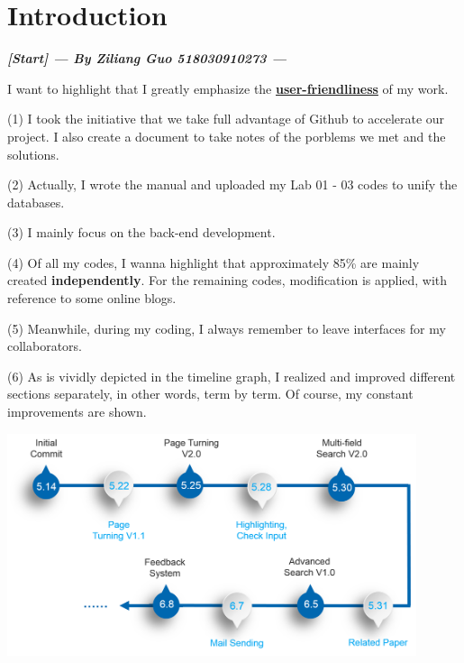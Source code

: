 \documentclass[10pt,twoside,a4paper,titlepage]{article}
\begin{document}
	\section{Introduction}
		\textbf{\emph{[Start] --- By Ziliang Guo 518030910273 ---}}\newline\par
		I want to highlight that I greatly emphasize the \textbf{\underline{user-friendliness}} of my work.\par
		(1) I took the initiative that we take full advantage of Github to accelerate our project. I also create a document to take notes of the porblems we met and the solutions.\newline\par
		(2) Actually, I wrote the manual and uploaded my Lab 01 - 03 codes to unify the databases.\newline\par
		(3)	I mainly focus on the back-end development.\newline\par
		(4) Of all my codes, I wanna highlight that approximately 85\% are mainly created \textbf{independently}. For the remaining codes, modification is applied, with reference to some online blogs.\newline\par
		(5) Meanwhile, during my coding, I always remember to leave interfaces for my collaborators.\newline\par
		(6)	As is vividly depicted in the timeline graph, I realized and improved different sections separately, in other words, term by term. Of course, my constant improvements are shown.\newline\par
		\includegraphics[width=0.9\textwidth]{gzl/01.png}

	\newpage
\end{document}
